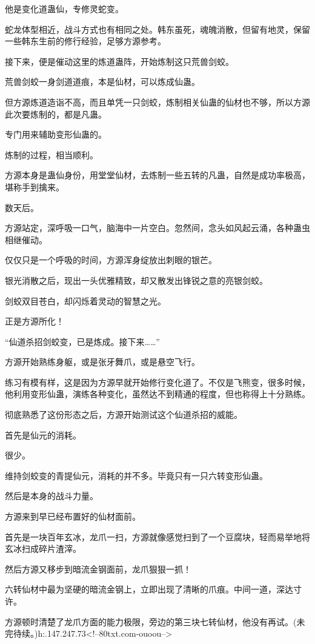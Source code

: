 \begin{this_body}
他是变化道蛊仙，专修灵蛇变。

蛇龙体型相近，战斗方式也有相同之处。韩东虽死，魂魄消散，但留有地灵，保留一些韩东生前的修行经验，足够方源参考。

接下来，便是催动这里的炼道蛊阵，开始炼制这只荒兽剑蛟。

荒兽剑蛟一身剑道道痕，本是仙材，可以炼成仙蛊。

但方源炼道造诣不高，而且单凭一只剑蛟，炼制相关仙蛊的仙材也不够，所以方源此次要炼制的，都是凡蛊。

专门用来辅助变形仙蛊的。

炼制的过程，相当顺利。

方源本身是蛊仙身份，用堂堂仙材，去炼制一些五转的凡蛊，自然是成功率极高，堪称手到擒来。

数天后。

方源站定，深呼吸一口气，脑海中一片空白。忽然间，念头如风起云涌，各种蛊虫相继催动。

仅仅只是一个呼吸的时间，方源浑身绽放出刺眼的银芒。

银光消散之后，现出一头优雅精致，却又散发出锋锐之意的亮银剑蛟。

剑蛟双目苍白，却闪烁着灵动的智慧之光。

正是方源所化！

“仙道杀招剑蛟变，已是炼成。接下来……”

方源开始熟练身躯，或是张牙舞爪，或是悬空飞行。

练习有模有样，这是因为方源早就开始修行变化道了。不仅是飞熊变，很多时候，他利用变形仙蛊，演练各种变化，虽然达不到精通的程度，但也称得上十分熟练。

彻底熟悉了这份形态之后，方源开始测试这个仙道杀招的威能。

首先是仙元的消耗。

很少。

维持剑蛟变的青提仙元，消耗的并不多。毕竟只有一只六转变形仙蛊。

然后是本身的战斗力量。

方源来到早已经布置好的仙材面前。

首先是一块百年玄冰，龙爪一扫，方源就像感觉扫到了一个豆腐块，轻而易举地将玄冰扫成碎片渣滓。

然后方源又移步到暗流金钢面前，龙爪狠狠一抓！

六转仙材中最为坚硬的暗流金钢上，立即出现了清晰的爪痕。中间一道，深达寸许。

方源顿时清楚了龙爪方面的能力极限，旁边的第三块七转仙材，他没有再试。(未完待续。)h:.147.247.73<!--80txt.com-ouoou-->

\end{this_body}

